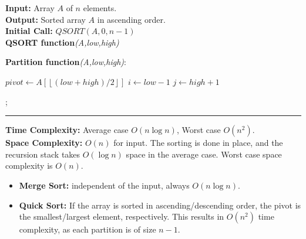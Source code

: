 \newpage 

\begin{Func}
    \textbf{Input:} Array $A$ of $n$ elements.\\
    \textbf{Output:} Sorted array $A$ in ascending order.\\
    \textbf{Initial Call:} $QSORT(A, 0, n-1)$\\

    \vspace{-.5em}
    \noindent
    \textbf{QSORT function}\textit{(A,low,high)}\\
    \begin{algorithm}[H]
        \label{algo:quicksort}
    \end{algorithm}

    \vspace{.5em}

    \noindent
    \textbf{Partition function}\textit{(A,low,high)}:\\
    \begin{algorithm}[H]
        $pivot \gets A[\left\lfloor (low + high)/2 \right\rfloor]$\;
        $i \gets low - 1$\;
        $j \gets high + 1$\;
        
        ; 
    \end{algorithm}

    \noindent\rule{\textwidth}{0.4pt}

    \noindent
    \textbf{Time Complexity:} Average case $O(n \log n)$, Worst case $O(n^2)$.\\
    \textbf{Space Complexity:} $O(n)$ for input. The sorting is done in place, and the recursion stack takes $O(\log n)$ space in the average case. Worst case space complexity is $O(n)$.
\end{Func}


\vspace{-1em}
\begin{theo}

    \begin{itemize}
        \item \textbf{Merge Sort:} independent of the input, always $O(n \log n)$.
        \vspace{-.5em}
        \item \textbf{Quick Sort:} If the array is sorted in ascending/descending order, the pivot is the smallest/largest element, respectively. This results in $O(n^2)$ time complexity, as each partition is of size $n-1$.
    \end{itemize}
\end{theo}

